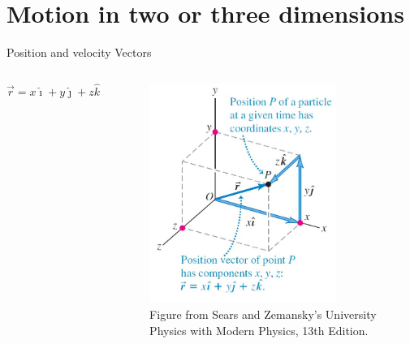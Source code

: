 \documentclass[]{beamer}
\begin{document}
\section{Motion in two or three dimensions}

\begin{frame}
    Position and velocity Vectors
    \vspace{3mm}
 
    \begin{columns}[c]
        \column{2in}  %
       
        \begin{equation}
          \vec{r}=x\hat{\imath}+y\hat{\jmath}+z\hat{k}
         \end{equation}
      
  
    
        \column{2.5in}
        
        \begin{figure}[h!]  
       \includegraphics[width=0.8\textwidth]{images/7.jpg}
        \caption{ {\tiny Figure from Sears and Zemansky's University Physics 
        with Modern Physics, 13th Edition.} }
     \end{figure}
     
     
     
        \end{columns}
    
\end{frame}
\end{document}
